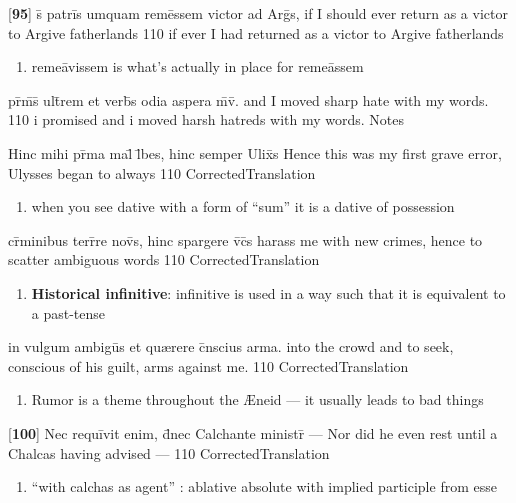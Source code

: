 \latline
  {[\textbf{95}] s\={\macron {\i}} patri\={}s umquam reme\={}ssem victor ad Arg\={}s,}
  { if I should ever return as a victor to Argive fatherlands }
  {110}
  { if ever I had returned as a victor to Argive fatherlands  }
  { \begin{enumerate}
  	\item reme\={a}vissem is what's actually in place for reme\={a}ssem
  \end{enumerate} }


\latline
  {pr\={}m\={\macron {\i}}s\={\macron {\i}} ult\={}rem et verb\={\macron {\i}}s odia aspera m\={}v\={\macron {\i}}.}
  { and I moved sharp hate with my words. }
  {110}
  { i promised and i moved harsh hatreds with my words. }
  { Notes }


\latline
  {Hinc mihi pr\={\macron {\i}}ma mal\={\macron {\i}} l\={}bes, hinc semper Ulix\={}s}
  { Hence this was my first grave error,  Ulysses began to always }
  {110}
  { CorrectedTranslation }
  { \begin{enumerate}
  	\item when you see dative with a form of ``sum'' it is a dative of possession
  \end{enumerate} }


\latline
  {cr\={\macron {\i}}minibus terr\={}re nov\={\macron {\i}}s, hinc spargere v\={}c\={}s}
  { harass me with new crimes, hence to scatter ambiguous words   }
  {110}
  { CorrectedTranslation }
  { \begin{enumerate}
  	\item \textbf{Historical infinitive}:  infinitive is used in a way such that it is equivalent to a past-tense
  \end{enumerate} }


\latline
  {in vulgum ambigu\={}s et qu{\ae}rere c\={}nscius arma.}
  { into the crowd and to seek, conscious of his guilt, arms against me. }
  {110}
  { CorrectedTranslation }
  { \begin{enumerate}
  	\item Rumor is a theme throughout the {\AE}neid --- it usually leads to bad things
  \end{enumerate} }


\latline
  {[\textbf{100}] Nec requi\={}vit enim, d\={}nec Calchante ministr\={} ---}
  { Nor did he even rest until a Chalcas having advised --- }
  {110}
  { CorrectedTranslation }
  { \begin{enumerate}
  	\item ``with calchas as agent'' :  ablative absolute with implied participle from esse
  \end{enumerate} }


